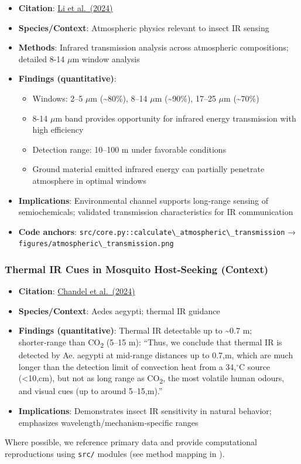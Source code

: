 \documentclass[
  13pt,
  a4paperpaper,
  12pt]{article}
\newcommand{\passthrough}[1]{#1}
\providecommand{\tightlist}{%
  \setlength{\itemsep}{0pt}\setlength{\parskip}{0pt}}
\begin{document}
\begin{itemize}
\tightlist
\item
  \textbf{Citation}:
  \href{https://pmc.ncbi.nlm.nih.gov/articles/PMC11193785/}{Li et
  al.~(2024)}
\item
  \textbf{Species/Context}: Atmospheric physics relevant to insect IR
  sensing
\item
  \textbf{Methods}: Infrared transmission analysis across atmospheric
  compositions; detailed 8-14 \(\mu\mathrm{m}\) window analysis
\item
  \textbf{Findings (quantitative)}:

  \begin{itemize}
  \tightlist
  \item
    Windows: 2--5 \(\mu\mathrm{m}\) (\textasciitilde80\%), 8--14
    \(\mu\mathrm{m}\) (\textasciitilde90\%), 17--25 \(\mu\mathrm{m}\)
    (\textasciitilde70\%)
  \item
    8-14 \(\mu\mathrm{m}\) band provides opportunity for infrared energy
    transmission with high efficiency
  \item
    Detection range: 10--100 m under favorable conditions
  \item
    Ground material emitted infrared energy can partially penetrate
    atmosphere in optimal windows
  \end{itemize}
\item
  \textbf{Implications}: Environmental channel supports long‑range
  sensing of semiochemicals; validated transmission characteristics for
  IR communication
\item
  \textbf{Code anchors}:
  \passthrough{\lstinline!src/core.py::calculate\_atmospheric\_transmission!}
  →
  \passthrough{\lstinline!figures/atmospheric\_transmission.png!}
\end{itemize}

\subsubsection{Thermal IR Cues in Mosquito Host‑Seeking
(Context)}\label{thermal-ir-cues-in-mosquito-hostseeking-context}

\begin{itemize}
\tightlist
\item
  \textbf{Citation}:
  \href{https://www.nature.com/articles/s41586-024-07848-5}{Chandel et
  al.~(2024)}
\item
  \textbf{Species/Context}: Aedes aegypti; thermal IR guidance
\item
  \textbf{Findings (quantitative)}: Thermal IR detectable up to
  \textasciitilde0.7 m; shorter‑range than CO\textsubscript{2} (5--15
  m): ``Thus, we conclude that thermal IR is detected by Ae. aegypti at
  mid-range distances up to 0.7,m, which are much longer than the
  detection limit of convection heat from a 34,\(^{\circ}\mathrm{C}\)
  source (\textless10,cm), but not as long range as CO\textsubscript{2},
  the most volatile human odours, and visual cues (up to around
  5--15,m).''
\item
  \textbf{Implications}: Demonstrates insect IR sensitivity in natural
  behavior; emphasizes wavelength/mechanism‑specific ranges
\end{itemize}

Where possible, we reference primary data and provide computational
reproductions using \passthrough{\lstinline!src/!} modules (see method
mapping in ).
\end{document}
